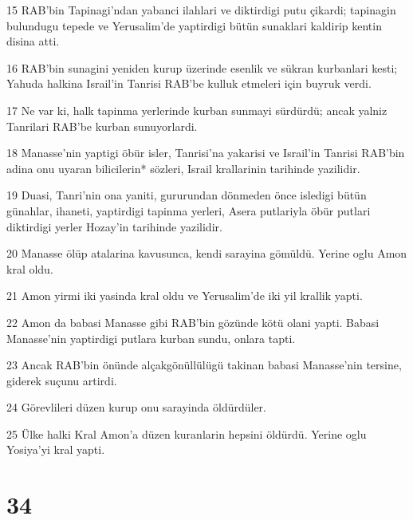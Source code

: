 \par 15 RAB'bin Tapinagi'ndan yabanci ilahlari ve diktirdigi putu çikardi; tapinagin bulundugu tepede ve Yerusalim'de yaptirdigi bütün sunaklari kaldirip kentin disina atti.
\par 16 RAB'bin sunagini yeniden kurup üzerinde esenlik ve sükran kurbanlari kesti; Yahuda halkina Israil'in Tanrisi RAB'be kulluk etmeleri için buyruk verdi.
\par 17 Ne var ki, halk tapinma yerlerinde kurban sunmayi sürdürdü; ancak yalniz Tanrilari RAB'be kurban sunuyorlardi.
\par 18 Manasse'nin yaptigi öbür isler, Tanrisi'na yakarisi ve Israil'in Tanrisi RAB'bin adina onu uyaran bilicilerin* sözleri, Israil krallarinin tarihinde yazilidir.
\par 19 Duasi, Tanri'nin ona yaniti, gururundan dönmeden önce isledigi bütün günahlar, ihaneti, yaptirdigi tapinma yerleri, Asera putlariyla öbür putlari diktirdigi yerler Hozay'in tarihinde yazilidir.
\par 20 Manasse ölüp atalarina kavusunca, kendi sarayina gömüldü. Yerine oglu Amon kral oldu.
\par 21 Amon yirmi iki yasinda kral oldu ve Yerusalim'de iki yil krallik yapti.
\par 22 Amon da babasi Manasse gibi RAB'bin gözünde kötü olani yapti. Babasi Manasse'nin yaptirdigi putlara kurban sundu, onlara tapti.
\par 23 Ancak RAB'bin önünde alçakgönüllülügü takinan babasi Manasse'nin tersine, giderek suçunu artirdi.
\par 24 Görevlileri düzen kurup onu sarayinda öldürdüler.
\par 25 Ülke halki Kral Amon'a düzen kuranlarin hepsini öldürdü. Yerine oglu Yosiya'yi kral yapti.

\chapter{34}

